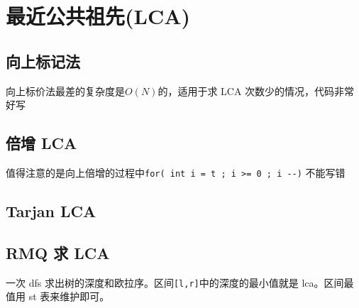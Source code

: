 \section{最近公共祖先(LCA)}
\subsection{向上标记法}
向上标价法最差的复杂度是$O(N)$的，适用于求 LCA 次数少的情况，代码非常好写

\subsection{倍增 LCA}
值得注意的是向上倍增的过程中\verb|for( int i = t ; i >= 0 ; i --)| 不能写错

\subsection{Tarjan LCA}
\subsection{RMQ 求 LCA}
一次 dfs 求出树的深度和欧拉序。区间\verb|[l,r]|中的深度的最小值就是 lca。区间最值用 st 表来维护即可。